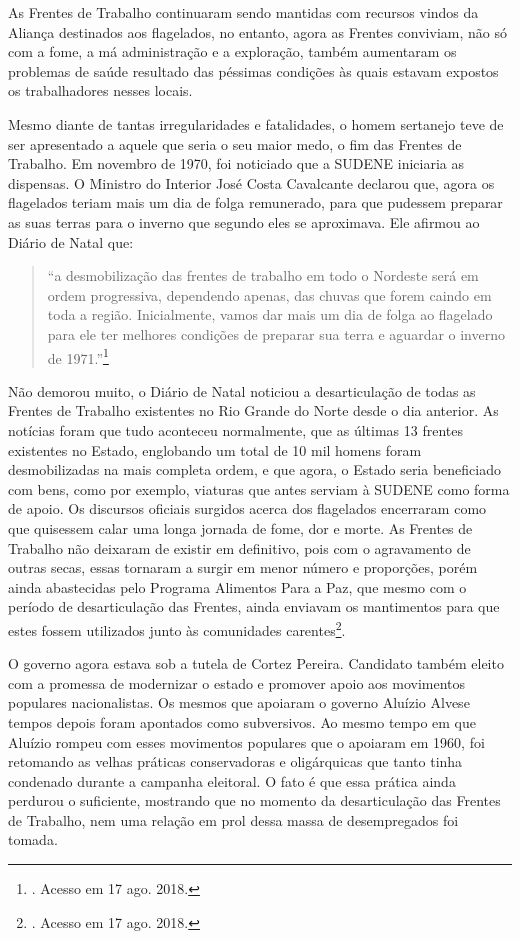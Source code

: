 \begin{refsection}
    As Frentes de Trabalho continuaram sendo mantidas com recursos vindos da Aliança destinados aos flagelados, no entanto, agora as Frentes conviviam, não só com a fome, a má administração e a exploração, também aumentaram os problemas de saúde resultado das péssimas condições às quais estavam expostos os trabalhadores nesses locais. 

    Mesmo diante de tantas irregularidades e fatalidades, o homem sertanejo teve de ser apresentado a aquele que seria o seu maior medo, o fim das Frentes de Trabalho. Em novembro de 1970, foi noticiado que a SUDENE iniciaria as dispensas. O Ministro do Interior José Costa Cavalcante declarou que, agora os flagelados teriam mais um dia de folga remunerado, para que pudessem preparar as suas terras para o inverno que segundo eles se aproximava. Ele afirmou ao Diário de Natal que: 

    \begin{quotation}
        ``a desmobilização das frentes de trabalho em todo o Nordeste será em ordem progressiva, dependendo apenas, das chuvas que forem caindo em toda a região. Inicialmente, vamos dar mais um dia de folga ao flagelado para ele ter melhores condições de preparar sua terra e aguardar o inverno de 1971.''\footnote{. Acesso em 17 ago. 2018.}
    \end{quotation}

    Não demorou muito, o Diário de Natal noticiou a desarticulação de todas as Frentes de Trabalho existentes no Rio Grande do Norte desde o dia anterior. As notícias foram que tudo aconteceu normalmente, que as últimas 13 frentes existentes no Estado, englobando um total de 10 mil homens foram desmobilizadas na mais completa ordem, e que agora, o Estado seria beneficiado com bens, como por exemplo, viaturas que antes serviam à SUDENE como forma de apoio. Os discursos oficiais surgidos acerca dos flagelados encerraram como que quisessem calar uma longa jornada de fome, dor e morte. As Frentes de Trabalho não deixaram de existir em definitivo, pois com o agravamento de outras secas, essas tornaram a surgir em menor número e proporções, porém ainda abastecidas pelo Programa Alimentos Para a Paz, que mesmo com o período de desarticulação das Frentes, ainda enviavam os mantimentos para que estes fossem utilizados junto às comunidades carentes\footnote{. Acesso em 17 ago. 2018.}.

    O governo agora estava sob a tutela de Cortez Pereira. Candidato também eleito com a promessa de modernizar o estado e promover apoio aos movimentos populares nacionalistas. Os mesmos que apoiaram o governo Aluízio Alvese tempos depois foram apontados como subversivos. Ao mesmo tempo em que Aluízio rompeu com esses movimentos populares que o apoiaram em 1960, foi retomando as velhas práticas conservadoras e oligárquicas que tanto tinha condenado durante a campanha eleitoral. O fato é que essa prática ainda perdurou o suficiente, mostrando que no momento da desarticulação das Frentes de Trabalho, nem uma relação em prol dessa massa de desempregados foi tomada.


\end{refsection}
